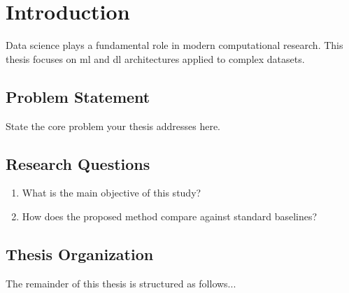 \chapter{Introduction}
\label{ch:introduction}

Data science plays a fundamental role in modern computational research. This thesis focuses on \gls{ml} and \gls{dl} architectures applied to complex datasets.

\section{Problem Statement}
State the core problem your thesis addresses here.

\section{Research Questions}
\begin{enumerate}
    \item What is the main objective of this study?
    \item How does the proposed method compare against standard baselines?
\end{enumerate}

\section{Thesis Organization}
The remainder of this thesis is structured as follows...